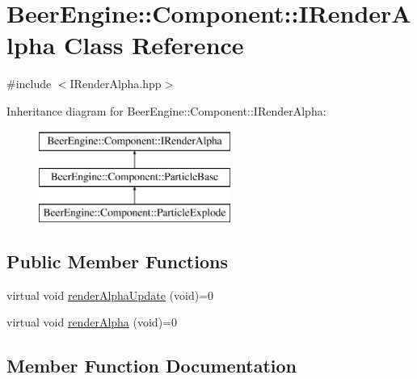 \hypertarget{class_beer_engine_1_1_component_1_1_i_render_alpha}{}\section{Beer\+Engine\+:\+:Component\+:\+:I\+Render\+Alpha Class Reference}
\label{class_beer_engine_1_1_component_1_1_i_render_alpha}


{\ttfamily \#include $<$I\+Render\+Alpha.\+hpp$>$}

Inheritance diagram for Beer\+Engine\+:\+:Component\+:\+:I\+Render\+Alpha\+:\begin{figure}[H]
\begin{center}
\leavevmode
\includegraphics[height=3.000000cm]{class_beer_engine_1_1_component_1_1_i_render_alpha}
\end{center}
\end{figure}
\subsection*{Public Member Functions}
\begin{DoxyCompactItemize}
\item 
virtual void \mbox{\hyperlink{class_beer_engine_1_1_component_1_1_i_render_alpha_ad0fd47a02cc63152b25dbfdb4b2639fa}{render\+Alpha\+Update}} (void)=0
\item 
virtual void \mbox{\hyperlink{class_beer_engine_1_1_component_1_1_i_render_alpha_a3797df36149a8a8416ef24406923f068}{render\+Alpha}} (void)=0
\end{DoxyCompactItemize}


\subsection{Member Function Documentation}
\mbox{\label{class_beer_engine_1_1_component_1_1_i_render_alpha_a3797df36149a8a8416ef24406923f068}} 
